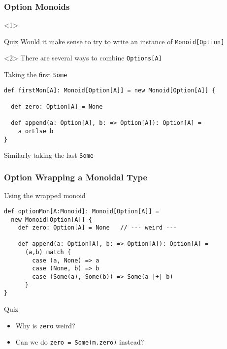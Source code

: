 \documentclass{beamer}
\begin{document}
\begin{frame}[fragile]
  \frametitle{Option Monoids}
  \begin{onlyenv}<1>
  \begin{block}{Quiz}
    Would it make sense to try to write an instance of
    \texttt{Monoid[Option]}
  \end{block}
  \end{onlyenv}

  \begin{onlyenv}<2>
    There are several ways to combine \texttt{Options[A]}

  \begin{block}{Taking the first \texttt{Some}}
  \begin{lstlisting}
def firstMon[A]: Monoid[Option[A]] = new Monoid[Option[A]] {

  def zero: Option[A] = None

  def append(a: Option[A], b: => Option[A]): Option[A] =
    a orElse b
}
  \end{lstlisting}
  \end{block}

  Similarly taking the last \texttt{Some}
  \end{onlyenv}

\end{frame}


\begin{frame}[fragile]
  \frametitle{Option Wrapping a Monoidal Type}
  \begin{block}{Using the wrapped monoid}
  \begin{lstlisting}
def optionMon[A:Monoid]: Monoid[Option[A]] =
  new Monoid[Option[A]] {
    def zero: Option[A] = None   // --- weird ---

    def append(a: Option[A], b: => Option[A]): Option[A] =
      (a,b) match {
        case (a, None) => a
        case (None, b) => b
        case (Some(a), Some(b)) => Some(a |+| b)
      }
}
  \end{lstlisting}
  \end{block}

  \begin{block}{Quiz}
    \begin{itemize}
      \item Why is \texttt{zero} weird?
      \item Can we do \texttt{zero = Some(m.zero)} instead?
    \end{itemize}
  \end{block}
\end{frame}
\end{document}
